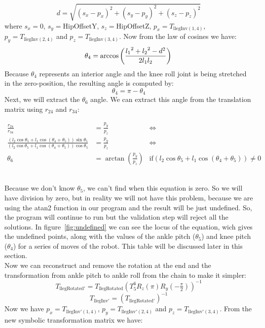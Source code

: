 \[
d = \sqrt{\left(s_x-p_x\right)^2 + \left(s_y-p_y\right)^2 + \left(s_z-p_z\right)^2}
\]
where $s_x = 0$, $s_y = $HipOffsetY, $s_z =$HipOffsetZ, $p_x = T_{\text{llegInv}(1,4)}$, $p_y = T_{\text{llegInv}(2,4)}$ and $p_z = T_{\text{llegInv}(3,4)}$. Now from the law of cosines we have:
\[
\theta_4 =\arccos\left(\frac{{l_1}^2 + {l_2}^2 - d^2}{2 l_1 l_2}\right)\\
\]
Because \(\theta_4\) represents an interior angle and the knee roll joint is being stretched in the zero-position, the resulting angle is computed by:
\[
\theta_4 = \pi - \theta_4
\]
Next, we will extract the \(\theta_6\) angle. We can extract this angle from the translation matrix using \(r_{24}\) and \(r_{34}\):
\begin{small}
\begin{align*}
\frac{r_{24}}{r_{34}} &= \frac{p_y}{p_z} &\Leftrightarrow \\
\frac{\left(l_2\cos\theta_5 + l_1 \cos\left(\theta_4 + \theta_5\right)\right)\sin\theta_5}{\left(l_2\cos\theta_5 + l_1 \cos\left(\theta_4 + \theta_5\right)\right) \cos\theta_5} &= \frac{p_y}{p_z} &\Leftrightarrow \\
\theta_6 &= \arctan\left(\frac{p_y}{p_z}\right)&\text{if} \left(l_2\cos\theta_5 + l_1 \cos\left(\theta_4 + \theta_5\right)\right) \neq 0
\end{align*}
\end{small}\\
Because we don't know $\theta_5$, we can't find when this equation is zero. So we will have division by zero, but in reality we will not have this problem, because we are using the atan2 function in our program and the result will be just undefined. So, the program will continue to run but the validation step will reject all the solutions. In figure~\ref{fig:undefined} we can see the locus of the equation, wich gives the undefined points, along with the values of the ankle pitch ($\theta_5$) and knee pitch ($\theta_4$) for a series of moves of the robot. This table will be discussed later in this section.\\
Now we can reconstruct and remove the rotation at the end and the transformation from ankle pitch to ankle roll from the chain to make it simpler:
\[
T_{\text{llegRotated}'} = T_\text{llegRotated}\left(T^6_5R_z\left(\pi\right)R_y(-\tfrac{\pi}{2})\right)^{-1}
\]
\[
T_{\text{llegInv}'} = \left( T_{\text{llegRotated}'} \right) ^{-1}
\]
Now we have $p_x = T_{\text{llegInv}'(1,4)}$, $p_y = T_{\text{llegInv}'(2,4)}$ and $p_z = T_{\text{llegInv}'(3,4)}$. From the new symbolic transformation matrix we have:
